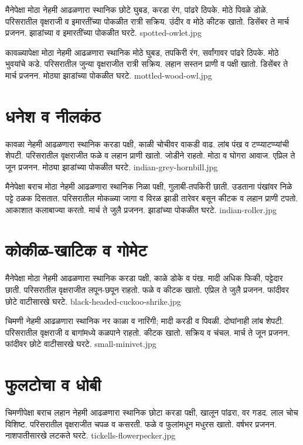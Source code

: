 \documentclass[aspectratio=169]{beamer}
\begin{document}
{मैनेपेक्षा मोठा}
{नेहमी आढळणारा स्थानिक}
{छोटे घुबड, करडा रंग, पांढरे ठिपके. मोठे पिवळे डोळे.}
{परिसरातील वृक्षराजी व इमारतींच्या पोकळीत}
{रात्री सक्रिय. उंदीर व मोठे कीटक खातो.}
{डिसेंबर ते मार्च प्रजनन. झाडांच्या व इमारतींच्या पोकळीत घरटे.}
{spotted-owlet.jpg}

{कावळ्यापेक्षा मोठा}
{नेहमी आढळणारा स्थानिक}
{मोठे घुबड, तपकिरी रंग, सर्वांगावर पांढरे ठिपके. मोठे भुवयांचे कडे.}
{परिसरातील जुन्या वृक्षराजीत}
{रात्री सक्रिय. लहान सस्तन प्राणी व पक्षी खातो.}
{डिसेंबर ते मार्च प्रजनन. मोठ्या झाडांच्या पोकळीत घरटे.}
{mottled-wood-owl.jpg}

\section{धनेश व नीलकंठ}
{कावळा}
{नेहमी आढळणारा स्थानिक}
{करडा पक्षी, काळी चोचीवर वाकडी वाढ. लांब पंख व टप्प्याटप्प्यांची शेपटी.}
{परिसरातील वृक्षराजीत}
{फळे व लहान प्राणी खातो. जोडीने राहतो. मोठा व घोगरा आवाज.}
{एप्रिल ते जून प्रजनन. मोठ्या झाडांच्या पोकळीत घरटे.}
{indian-grey-hornbill.jpg}

{मैनेपेक्षा बराच मोठा}
{नेहमी आढळणारा स्थानिक}
{निळा पक्षी, गुलाबी-तपकिरी छाती. उडताना पंखांवर निळे पट्टे ठळक दिसतात.}
{परिसरातील मोकळ्या जागा व विरळ झाडी}
{तारेवर बसून कीटक व लहान प्राणी टपतो. आकाशात कलाबाज्या करतो.}
{मार्च ते जुलै प्रजनन. झाडांच्या पोकळीत घरटे.}
{indian-roller.jpg}

\section{कोकीळ-खाटिक व गोमेट}
{मैनेपेक्षा मोठा}
{नेहमी आढळणारा स्थानिक}
{करडा पक्षी, काळे डोके व पंख. मादी अधिक फिकी, पट्टेदार छाती.}
{परिसरातील वृक्षराजीत}
{लपून-छपून राहतो. फळे व कीटक खातो.}
{एप्रिल ते जुलै प्रजनन. फांदीवर छोटे वाटीसारखे घरटे.}
{black-headed-cuckoo-shrike.jpg}

{चिमणी}
{नेहमी आढळणारा स्थानिक}
{नर काळा व नारिंगी; मादी करडी व पिवळी. दोघांनाही लांब शेपटी.}
{परिसरातील वृक्षराजी व बागांमध्ये}
{कळपाने राहतो. कीटक खातो. सक्रिय व चंचल.}
{मार्च ते जून प्रजनन. फांदीवर छोटे वाटीसारखे घरटे.}
{small-minivet.jpg}

\section{फुलटोचा व धोबी}
{चिमणीपेक्षा बराच लहान}
{नेहमी आढळणारा स्थानिक}
{छोटा करडा पक्षी, खालून पांढरा, वर गडद. लाल चोच विशिष्ट.}
{परिसरातील वृक्षराजीत}
{चपळ व कसरती. फळे व फुलांमधून मधुरस खातो.}
{वर्षभर प्रजनन. नाशपातीसारखे लटकते घरटे.}
{tickells-flowerpecker.jpg}
\end{document}
